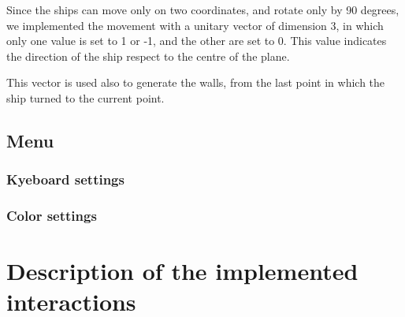\documentclass[11pt]{article}
\begin{document}
Since the ships can move only on two coordinates, and rotate  only by 90 degrees, we implemented the movement with a unitary vector of dimension 3, in which only one value is set to 1 or -1, and the other are set to 0. This value indicates the direction of the ship respect to the centre of the plane. 

This vector is used also to generate the walls, from the last point in which the ship turned to the current point.
\subsection{Menu}

\subsubsection{Kyeboard settings}

\subsubsection{Color settings}

\section{Description of the implemented interactions}
\end{document}
